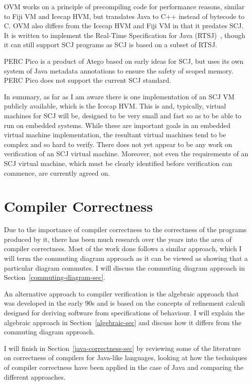 \documentclass[a4paper,10pt]{article}
\begin{document}
OVM works on a principle of precompiling code for performance reasons, similar
to Fiji VM and Icecap HVM, but translates Java to C++ instead of bytecode to C.
OVM also differs from the Icecap HVM and Fiji VM in that it predates SCJ. It is
written to implement the Real-Time Specification for Java
(RTSJ)~\cite{gosling2000}, though it can still support SCJ programs as SCJ is
based on a subset of RTSJ.

PERC Pico is a product of Atego based on early ideas for SCJ, but uses its own
system of Java metadata annotations to ensure the safety of scoped memory. PERC
Pico does not support the current SCJ standard.

In summary, as far as I am aware there is one implementation of an SCJ VM
publicly available, which is the Icecap HVM. This is and, typically, virtual
machines for SCJ will be, designed to be very small and fast so as to be able to
run on embedded systems.  While these are important goals in an embedded virtual
machine implementation, the resultant virtual machines tend to be complex and so
hard to verify.  There does not yet appear to be any work on verification of an
SCJ virtual machine.  Moreover, not even the requirements of an SCJ virtual
machine, which must be clearly identified before verification can commence, are
currently agreed on.

\section{Compiler Correctness}
\label{compiler-correctness-sec}

Due to the importance of compiler correctness to the correctness of the programs
produced by it, there has been much research over the years into the area of
compiler correctness. Most of the work done follows a similar approach, which I
will term the commuting diagram approach as it can be viewed as showing that a
particular diagram commutes. I will discuss the commuting diagram approach in
Section~\ref{commuting-diagram-sec}.

An alternative approach to compiler verification is the algebraic approach that
was developed in the early 90s and is based on the concepts of refinement
calculi designed for deriving software from specifications of behaviour. I will
explain the algebraic approach in Section~\ref{algebraic-sec} and discuss how it
differs from the commuting diagram approach.

I will finish in Section~\ref{java-correctness-sec} by reviewing some of the
literature on correctness of compilers for Java-like languages, looking at how
the techniques of compiler correctness have been applied in the case of Java and
comparing the different approaches.
\end{document}
